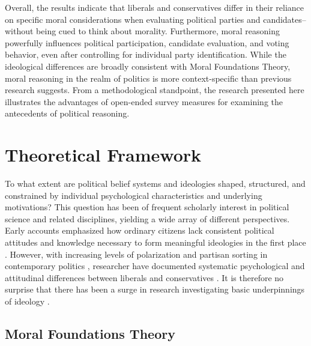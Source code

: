 \documentclass[12pt]{article}
\begin{document}
Overall, the results indicate that liberals and conservatives differ in their reliance on specific moral considerations when evaluating political parties and candidates--without being cued to think about morality. Furthermore, moral reasoning powerfully influences political participation, candidate evaluation, and voting behavior, even after controlling for individual party identification. While the ideological differences are broadly consistent with Moral Foundations Theory, moral reasoning in the realm of politics is more context-specific than previous research suggests. From a methodological standpoint, the research presented here illustrates the advantages of open-ended survey measures for examining the antecedents of political reasoning.


\section{Theoretical Framework}

To what extent are political belief systems and ideologies shaped, structured, and constrained by individual psychological characteristics and underlying motivations? This question has been of frequent scholarly interest in political science and related disciplines, yielding a wide array of different perspectives. Early accounts emphasized how ordinary citizens lack consistent political attitudes and knowledge necessary to form meaningful ideologies in the first place \citep[e.g.][]{converse1964nature}. However, with increasing levels of polarization and partisan sorting in contemporary politics \citep{iyengar2015fear}, researcher have documented systematic psychological and attitudinal differences between liberals and conservatives \citep{jost2006end}. It is therefore no surprise that there has been a surge in research investigating basic underpinnings of ideology \citep[see also][]{jost2003political,jost2009political}.


\subsection{Moral Foundations Theory}
\end{document}
